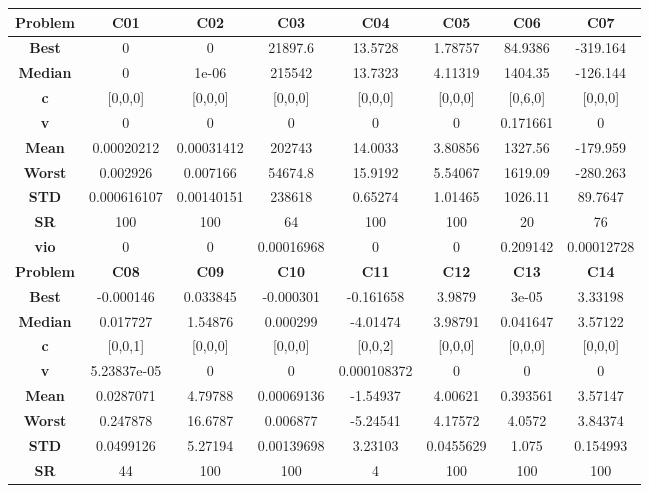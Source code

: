 \documentclass{IEEEtran}
\begin{document}
\begin{center} 
  \begin{tabular}{|c|c|c|c|c|c|c|c|}
    \hline 
    \textbf{Problem} & \textbf{C01} & \textbf{C02} & \textbf{C03} & \textbf{C04} & \textbf{C05} & \textbf{C06} & \textbf{C07} \\ 
    \hline\hline 
    \textbf{Best} & 0 & 0 & 21897.6 & 13.5728 & 1.78757 & 84.9386 & -319.164\\ 
    \textbf{Median} & 0 & 1e-06 & 215542 & 13.7323 & 4.11319 & 1404.35 & -126.144\\ 
    \textbf{c} & [0,0,0] & [0,0,0] & [0,0,0] & [0,0,0] & [0,0,0] & [0,6,0] & [0,0,0]\\ 
    \textbf{v} & 0 & 0 & 0 & 0 & 0 & 0.171661 & 0\\ 
    \textbf{Mean} & 0.00020212 & 0.00031412 & 202743 & 14.0033 & 3.80856 & 1327.56 & -179.959\\ 
    \textbf{Worst} & 0.002926 & 0.007166 & 54674.8 & 15.9192 & 5.54067 & 1619.09 & -280.263\\ 
    \textbf{STD} & 0.000616107 & 0.00140151 & 238618 & 0.65274 & 1.01465 & 1026.11 & 89.7647\\ 
    \textbf{SR} & 100 & 100 & 64 & 100 & 100 & 20 & 76\\ 
    \textbf{vio} & 0 & 0 & 0.00016968 & 0 & 0 & 0.209142 & 0.00012728\\ 
    \hline 
    \hline 
    \textbf{Problem} & \textbf{C08} & \textbf{C09} & \textbf{C10} & \textbf{C11} & \textbf{C12} & \textbf{C13} & \textbf{C14} \\ 
    \hline\hline 
    \textbf{Best} & -0.000146 & 0.033845 & -0.000301 & -0.161658 & 3.9879 & 3e-05 & 3.33198\\ 
    \textbf{Median} & 0.017727 & 1.54876 & 0.000299 & -4.01474 & 3.98791 & 0.041647 & 3.57122\\ 
    \textbf{c} & [0,0,1] & [0,0,0] & [0,0,0] & [0,0,2] & [0,0,0] & [0,0,0] & [0,0,0]\\ 
    \textbf{v} & 5.23837e-05 & 0 & 0 & 0.000108372 & 0 & 0 & 0\\ 
    \textbf{Mean} & 0.0287071 & 4.79788 & 0.00069136 & -1.54937 & 4.00621 & 0.393561 & 3.57147\\ 
    \textbf{Worst} & 0.247878 & 16.6787 & 0.006877 & -5.24541 & 4.17572 & 4.0572 & 3.84374\\ 
    \textbf{STD} & 0.0499126 & 5.27194 & 0.00139698 & 3.23103 & 0.0455629 & 1.075 & 0.154993\\ 
    \textbf{SR} & 44 & 100 & 100 & 4 & 100 & 100 & 100\\ 

\end{tabular}
\end{center}
\end{document}
